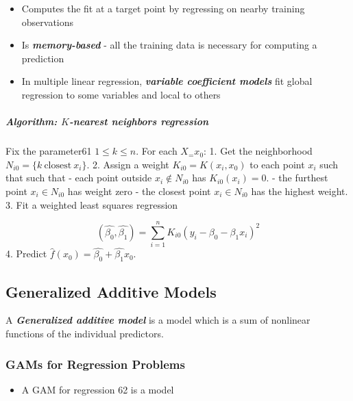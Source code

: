 \documentclass[11pt]{article}
\providecommand{\tightlist}{%
      \setlength{\itemsep}{0pt}\setlength{\parskip}{0pt}}
\begin{document}
    \begin{itemize}
\tightlist
\item
  Computes the fit at a target point by regressing on nearby training
  observations
\item
  Is \textbf{\emph{memory-based}} - all the training data is necessary
  for computing a prediction
\item
  In multiple linear regression, \textbf{\emph{variable coefficient
  models}} fit global regression to some variables and local to others
\end{itemize}

    \hypertarget{algorithm-k-nearest-neighbors-regression}{%
\subparagraph{\texorpdfstring{Algorithm: \(K\)-nearest neighbors
regression}{Algorithm: K-nearest neighbors regression}}\label{algorithm-k-nearest-neighbors-regression}}

    Fix the parameter61 \(1 \leqslant k \leqslant n\). For each \(X_=x_0\):
1. Get the neighborhood \(N_{i0}= \{k\ \text{closest}\ x_i\}\). 2.
Assign a weight \(K_{i0} = K(x_i, x_0)\) to each point \(x_i\) such that
such that - each point outside \(x_i\notin N_{i0}\) has
\(K_{i0}(x_i)=0\). - the furthest point \(x_i\in N_{i0}\) has weight
zero - the closest point \(x_i\in N_{i0}\) has the highest weight. 3.
Fit a weighted least squares regression

\[ (\hat{\beta_0}, \hat{\beta_1}) = \sum_{i=1}^nK_{i0}(y_i - \beta_0 - \beta_1 x_i)^2\]
4. Predict \(\hat{f}(x_0) = \hat{\beta_0} + \hat{\beta_1}x_0\).

    \hypertarget{generalized-additive-models}{%
\subsection{Generalized Additive
Models}\label{generalized-additive-models}}

    A \textbf{\emph{Generalized additive model}} is a model which is a sum
of nonlinear functions of the individual predictors.

    \hypertarget{gams-for-regression-problems}{%
\subsubsection{GAMs for Regression
Problems}\label{gams-for-regression-problems}}

    \begin{itemize}
\tightlist
\item
  A GAM for regression 62 is a model
\end{itemize}
\end{document}
